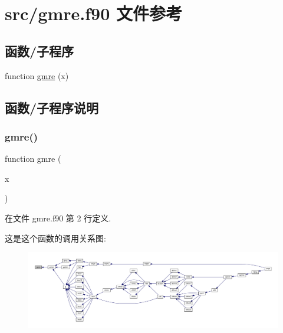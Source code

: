 \hypertarget{gmre_8f90}{}\section{src/gmre.f90 文件参考}
\label{gmre_8f90}
\subsection*{函数/子程序}
\begin{DoxyCompactItemize}
\item 
function \mbox{\hyperlink{gmre_8f90_a49cfd1ee4f5604e6a082575e0cf129d5}{gmre}} (x)
\end{DoxyCompactItemize}


\subsection{函数/子程序说明}
\mbox{\label{gmre_8f90_a49cfd1ee4f5604e6a082575e0cf129d5}} 
\subsubsection{\texorpdfstring{gmre()}{gmre()}}
{\footnotesize\ttfamily function gmre (\begin{DoxyParamCaption}\item[{}]{x }\end{DoxyParamCaption})}



在文件 gmre.\+f90 第 2 行定义.

这是这个函数的调用关系图\+:
\nopagebreak
\begin{figure}[H]
\begin{center}
\leavevmode
\includegraphics[width=350pt]{gmre_8f90_a49cfd1ee4f5604e6a082575e0cf129d5_icgraph}
\end{center}
\end{figure}
